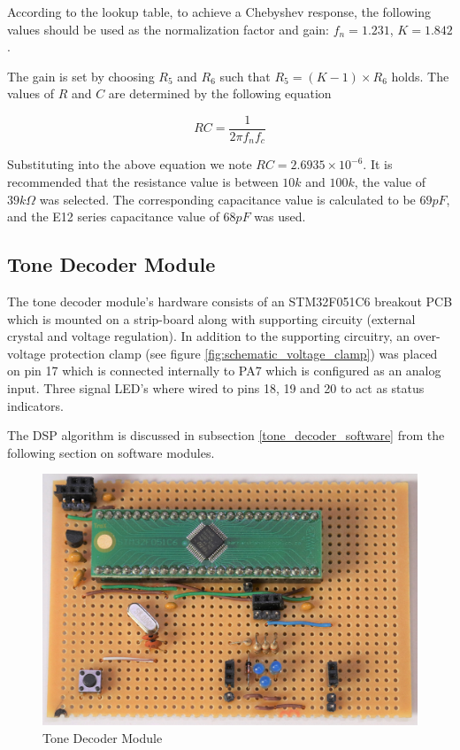 According to the lookup table, to achieve a Chebyshev response, the following values should be used as the normalization factor and gain: \(f_n = 1.231\), \(K = 1.842\).

The gain is set by choosing $R_5$ and $R_6$ such that \(R_5 = (K - 1) \times R_6\) holds. The values of $R$ and $C$ are determined by the following equation


\[RC = \frac{1}{2\pi f_n f_c}\]

Substituting into the above equation we note $RC = 2.6935\times 10^{-6}$. It is recommended that the resistance value is between $10k$ and $100k$, the value of $39k\Omega$ was selected. The corresponding capacitance value is calculated to be $69pF$, and the E12 series capacitance value of $68pF$ was used.



\subsection{Tone Decoder Module}

The tone decoder module's hardware consists of an STM32F051C6 breakout PCB which is mounted on a strip-board along with supporting circuity (external crystal and voltage regulation). In addition to the supporting circuitry, an over-voltage protection clamp (see figure \ref{fig:schematic_voltage_clamp}) was placed on pin 17 which is connected internally to PA7 which is configured as an analog input. Three signal LED's where wired to pins 18, 19 and 20 to act as status indicators.

The DSP algorithm is discussed in subsection \ref{tone_decoder_software} from the following section on software modules.


\begin{figure}[H]
	\centering
	\includegraphics[width=.6\textwidth]{figures/modules/goertzel_filter.jpg}
	\caption{Tone Decoder Module}
	\label{fig:module_tone_decoder}
\end{figure}



